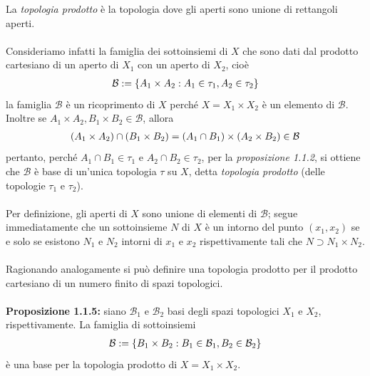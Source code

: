 \documentclass{article}
\begin{document}
La \textit{topologia prodotto} è la topologia dove gli aperti sono unione di rettangoli aperti. \\ \\
Consideriamo infatti la famiglia dei sottoinsiemi di $X$ che sono dati dal prodotto cartesiano di un aperto di $X_1$ con un aperto di $X_2$, cioè
\begin{gather}
    \mathcal{B} := \{ A_1 \times A_2 : A_1 \in \tau_1, A_2 \in \tau_2 \} \notag
\end{gather}
la famiglia $\mathcal{B}$ è un ricoprimento di $X$ perché $X = X_1 \times X_2$ è un elemento di $\mathcal{B}$. Inoltre se $A_1 \times A_2, B_1 \times B_2 \in \mathcal{B}$, allora
\begin{gather}
    (A_1 \times A_2) \cap (B_1 \times B_2) = (A_1 \cap B_1) \times (A_2 \times B_2) \in \mathcal{B} \notag
\end{gather}
pertanto, perché $A_1 \cap B_1 \in \tau_1$ e $A_2 \cap B_2 \in \tau_2$, per la \textit{proposizione 1.1.2}, si ottiene che $\mathcal{B}$ è base di un'unica topologia $\tau$ su $X$, detta \textit{topologia prodotto} (delle topologie $\tau_1$ e $\tau_2$). \\ \\
Per definizione, gli aperti di $X$ sono unione di elementi di $\mathcal{B}$; segue immediatamente che un sottoinsieme $N$ di $X$ è un intorno del punto $(x_1, x_2)$ se e solo se esistono $N_1$ e $N_2$ intorni di $x_1$ e $x_2$ rispettivamente tali che $N \supset N_1 \times N_2$. \\ \\
Ragionando analogamente si può definire una topologia prodotto per il prodotto cartesiano di un numero finito di spazi topologici. \\ \\
\textbf{Proposizione 1.1.5:} siano $\mathcal{B}_1$ e $\mathcal{B}_2$ basi degli spazi topologici $X_1$ e $X_2$, rispettivamente. La famiglia di sottoinsiemi
\begin{gather}
    \mathcal{B} := \{ B_1 \times B_2 : B_1 \in \mathcal{B}_1, B_2 \in \mathcal{B}_2 \} \notag
\end{gather}
è una base per la topologia prodotto di $X = X_1 \times X_2$. \\
\end{document}
